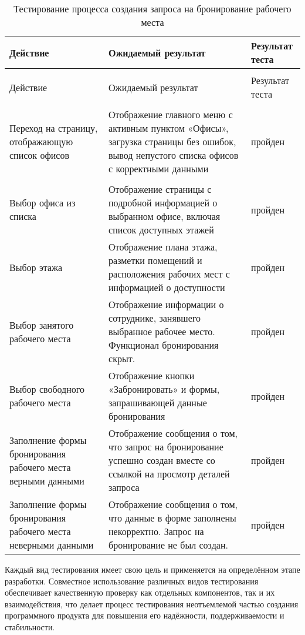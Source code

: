 \begingroup
\singlespacing
\vspace{-\baselineskip}
\begin{longtable}{|>{\raggedright}m{}
                  |>{\raggedright}m{}
                  |>{\raggedright\arraybackslash}p{}|}
    \caption{Тестирование процесса создания запроса на бронирование рабочего места} \label{table:system-implementation:testing:booking} \\ \hline
    Действие & Ожидаемый результат & Результат теста \\ \hline
    \endfirsthead
    \multicolumn{3}{@{}l}{\noindent Продолжение таблицы~\thetable} \\ \hline
    Действие & Ожидаемый результат & Результат теста \\ \hline
    \endhead
    \multicolumn{3}{|l|}{\textbf{Предусловие}} \\
    \hline
    Переход на страницу, отображающую список офисов & Отображение главного меню с активным пунктом «Офисы», загрузка страницы без ошибок, вывод непустого списка офисов с корректными данными & пройден \\
    \hline
    \multicolumn{3}{|l|}{\textbf{Шаги теста}} \\
    \hline
    Выбор офиса из списка & Отображение страницы с подробной информацией о выбранном офисе, включая список доступных этажей & пройден \\
    \hline
    Выбор этажа & Отображение плана этажа, разметки помещений и расположения рабочих мест с информацией о доступности & пройден \\
    \hline
    Выбор занятого рабочего места & Отображение информации о сотруднике, занявшего выбранное рабочее место. Функционал бронирования скрыт. & пройден \\
    \hline
    Выбор свободного рабочего места & Отображение кнопки «Забронировать» и формы, запрашивающей данные бронирования & пройден \\
    \hline
    Заполнение формы бронирования рабочего места верными данными & Отображение сообщения о том, что запрос на бронирование успешно создан вместе со ссылкой на просмотр деталей запроса & пройден \\
    \hline
    Заполнение формы бронирования рабочего места неверными данными & Отображение сообщения о том, что данные в форме заполнены некорректно. Запрос на бронирование не был создан. & пройден \\
    \hline
\end{longtable}
\endgroup

Каждый вид тестирования имеет свою цель и применяется на определённом этапе разработки. Совместное использование различных видов тестирования обеспечивает качественную проверку как отдельных компонентов, так и их взаимодействия, что делает процесс тестирования неотъемлемой частью создания программного продукта для повышения его надёжности, поддерживаемости и стабильности.
